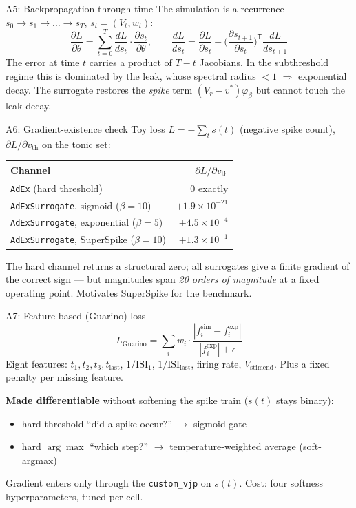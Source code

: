 \documentclass[17pt, t, lualatex]{beamer}
\newcommand{\Loss}{L}
\begin{document}
\begin{frame}{A5: Backpropagation through time}
The simulation is a recurrence $s_0 \to s_1 \to \dots \to s_T$, $s_t=(V_t,w_t)$:
\[
\frac{\partial L}{\partial\theta}=\sum_{t=0}^{T}\frac{dL}{ds_t}\cdot\frac{\partial s_t}{\partial\theta},\qquad
\frac{dL}{ds_t}=\frac{\partial L}{\partial s_t}+\Big(\frac{\partial s_{t+1}}{\partial s_t}\Big)^{\!\mathsf{T}}\frac{dL}{ds_{t+1}}
\]
\small
The error at time $t$ carries a product of $T-t$ Jacobians. In the subthreshold regime this is dominated by the leak, whose spectral radius $<1$ $\Rightarrow$ exponential decay. The surrogate restores the \emph{spike} term $(V_r-v^*)\varphi_\beta$ but cannot touch the leak decay.
\end{frame}

\begin{frame}{A6: Gradient-existence check}
\centering\small
Toy loss $\Loss=-\sum_t s(t)$ (negative spike count), $\partial\Loss/\partial v_{\text{th}}$ on the tonic set:
\vspace{0.2cm}

\begin{tabular}{lr}
\toprule
Channel & $\partial\Loss/\partial v_{\text{th}}$ \\
\midrule
\texttt{AdEx} (hard threshold)        & $0$ exactly \\
\texttt{AdExSurrogate}, sigmoid ($\beta{=}10$)    & $+1.9\times10^{-21}$ \\
\texttt{AdExSurrogate}, exponential ($\beta{=}5$) & $+4.5\times10^{-4}$ \\
\texttt{AdExSurrogate}, SuperSpike ($\beta{=}10$) & $+1.3\times10^{-1}$ \\
\bottomrule
\end{tabular}
\vspace{0.3cm}

\footnotesize The hard channel returns a structural zero; all surrogates give a finite gradient of the correct sign --- but magnitudes span \emph{20 orders of magnitude} at a fixed operating point. Motivates SuperSpike for the benchmark.
\end{frame}

\begin{frame}{A7: Feature-based (Guarino) loss}
\[
\Loss_{\text{Guarino}}=\sum_i w_i\cdot\frac{|f_i^{\text{sim}}-f_i^{\text{exp}}|}{|f_i^{\text{exp}}|+\epsilon}
\]
\small
Eight features: $t_1,t_2,t_3,t_{\text{last}}$, $1/\text{ISI}_1$, $1/\text{ISI}_{\text{last}}$, firing rate, $V_{\text{stimend}}$. Plus a fixed penalty per missing feature.
\vspace{0.2cm}

\textbf{Made differentiable} without softening the spike train ($s(t)$ stays binary):
\begin{itemize}
  \item hard threshold ``did a spike occur?'' $\to$ sigmoid gate
  \item hard $\arg\max$ ``which step?'' $\to$ temperature-weighted average (soft-argmax)
\end{itemize}
Gradient enters only through the \texttt{custom\_vjp} on $s(t)$. Cost: four softness hyperparameters, tuned per cell.
\end{frame}
\end{document}
